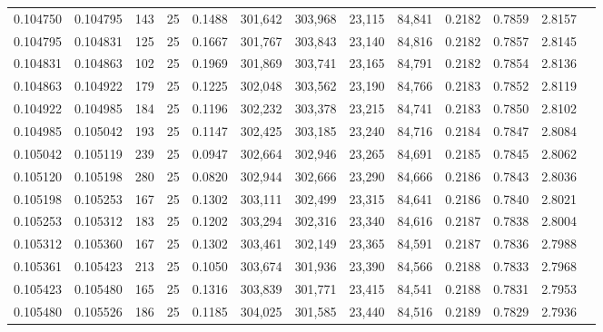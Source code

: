 \begin{tabular}{rrrrrrrrrrrrr}
0.104750 & 0.104795 &   143 &  25 &                                     0.1488 & 301,642 & 303,968 &  23,115 &  84,841 & 0.2182 & 0.7859 & 2.8157 \\
0.104795 & 0.104831 &   125 &  25 &                                     0.1667 & 301,767 & 303,843 &  23,140 &  84,816 & 0.2182 & 0.7857 & 2.8145 \\
0.104831 & 0.104863 &   102 &  25 &                                     0.1969 & 301,869 & 303,741 &  23,165 &  84,791 & 0.2182 & 0.7854 & 2.8136 \\
0.104863 & 0.104922 &   179 &  25 &                                     0.1225 & 302,048 & 303,562 &  23,190 &  84,766 & 0.2183 & 0.7852 & 2.8119 \\
0.104922 & 0.104985 &   184 &  25 &                                     0.1196 & 302,232 & 303,378 &  23,215 &  84,741 & 0.2183 & 0.7850 & 2.8102 \\
0.104985 & 0.105042 &   193 &  25 &                                     0.1147 & 302,425 & 303,185 &  23,240 &  84,716 & 0.2184 & 0.7847 & 2.8084 \\
0.105042 & 0.105119 &   239 &  25 &                                     0.0947 & 302,664 & 302,946 &  23,265 &  84,691 & 0.2185 & 0.7845 & 2.8062 \\
0.105120 & 0.105198 &   280 &  25 &                                     0.0820 & 302,944 & 302,666 &  23,290 &  84,666 & 0.2186 & 0.7843 & 2.8036 \\
0.105198 & 0.105253 &   167 &  25 &                                     0.1302 & 303,111 & 302,499 &  23,315 &  84,641 & 0.2186 & 0.7840 & 2.8021 \\
0.105253 & 0.105312 &   183 &  25 &                                     0.1202 & 303,294 & 302,316 &  23,340 &  84,616 & 0.2187 & 0.7838 & 2.8004 \\
0.105312 & 0.105360 &   167 &  25 &                                     0.1302 & 303,461 & 302,149 &  23,365 &  84,591 & 0.2187 & 0.7836 & 2.7988 \\
0.105361 & 0.105423 &   213 &  25 &                                     0.1050 & 303,674 & 301,936 &  23,390 &  84,566 & 0.2188 & 0.7833 & 2.7968 \\
0.105423 & 0.105480 &   165 &  25 &                                     0.1316 & 303,839 & 301,771 &  23,415 &  84,541 & 0.2188 & 0.7831 & 2.7953 \\
0.105480 & 0.105526 &   186 &  25 &                                     0.1185 & 304,025 & 301,585 &  23,440 &  84,516 & 0.2189 & 0.7829 & 2.7936 \\

\end{tabular}
